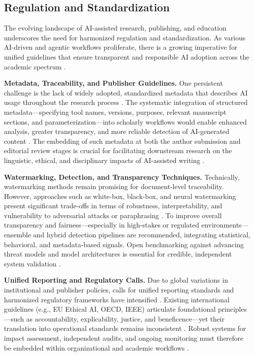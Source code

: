 \subsection{Regulation and Standardization}

The evolving landscape of AI-assisted research, publishing, and education underscores the need for harmonized regulation and standardization. As various AI-driven and agentic workflows proliferate, there is a growing imperative for unified guidelines that ensure transparent and responsible AI adoption across the academic spectrum \cite{ref1,ref2,ref5,ref9,ref10,ref28,ref29,ref30,ref31,ref37,ref38,ref43,ref51,ref61,ref62,ref63,ref68,ref78,ref80,ref86,ref87,ref88,ref89,ref90,ref96,ref98,ref106}.

\textbf{Metadata, Traceability, and Publisher Guidelines.}  
One persistent challenge is the lack of widely adopted, standardized metadata that describes AI usage throughout the research process \cite{ref95,ref100,ref101,ref106}. The systematic integration of structured metadata—specifying tool names, versions, purposes, relevant manuscript sections, and parameterization—into scholarly workflows would enable enhanced analysis, greater transparency, and more reliable detection of AI-generated content \cite{ref95,ref101,ref106}. The embedding of such metadata at both the author submission and editorial review stages is crucial for facilitating downstream research on the linguistic, ethical, and disciplinary impacts of AI-assisted writing \cite{ref95,ref100,ref101,ref106}.

\textbf{Watermarking, Detection, and Transparency Techniques.}  
Technically, watermarking methods remain promising for document-level traceability. However, approaches such as white-box, black-box, and neural watermarking present significant trade-offs in terms of robustness, interpretability, and vulnerability to adversarial attacks or paraphrasing \cite{ref53,ref86,ref91,ref97,ref98,ref100}. To improve overall transparency and fairness—especially in high-stakes or regulated environments—ensemble and hybrid detection pipelines are recommended, integrating statistical, behavioral, and metadata-based signals. Open benchmarking against advancing threat models and model architectures is essential for credible, independent system validation \cite{ref1,ref2,ref31,ref80,ref85,ref86,ref98,ref106}.

\textbf{Unified Reporting and Regulatory Calls.}  
Due to global variations in institutional and publisher policies, calls for unified reporting standards and harmonized regulatory frameworks have intensified \cite{ref5,ref9,ref10,ref28,ref29,ref30,ref31,ref38,ref43,ref63,ref68,ref87,ref88,ref89,ref90,ref106}. Existing international guidelines (e.g., EU Ethical AI, OECD, IEEE) articulate foundational principles—such as accountability, explicability, justice, and beneficence—yet their translation into operational standards remains inconsistent \cite{ref9,ref10,ref28,ref29,ref38,ref51,ref62,ref86,ref87,ref88,ref90,ref96,ref106}. Robust systems for impact assessment, independent audits, and ongoing monitoring must therefore be embedded within organizational and academic workflows \cite{ref29,ref31,ref43,ref61,ref62,ref63,ref80,ref84,ref85,ref89,ref92,ref95,ref96,ref98,ref100,ref106}.

